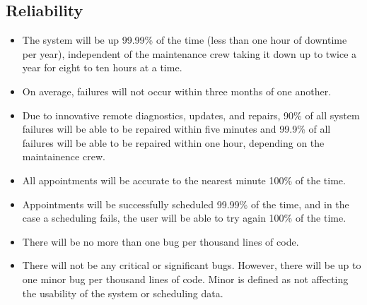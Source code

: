 \subsection{Reliability}
\begin{itemize}
\item The system will be up 99.99\% of the time (less than one hour of downtime per year), independent of the maintenance crew taking it down up to twice a year for eight to ten hours at a time.
\item On average, failures will not occur within three months of one another.
\item Due to innovative remote diagnostics, updates, and repairs, 90\% of all system failures will be able to be repaired within five minutes and 99.9\% of all failures will be able to be repaired within one hour, depending on the maintainence crew.
\item All appointments will be accurate to the nearest minute 100\% of the time.
\item Appointments will be successfully scheduled 99.99\% of the time, and in the case a scheduling fails, the user will be able to try again 100\% of the time.
\item There will be no more than one bug per thousand lines of code.
\item There will not be any critical or significant bugs. However, there will be up to one minor bug per thousand lines of code. Minor is defined as not affecting the usability of the system or scheduling data.
\end{itemize}
